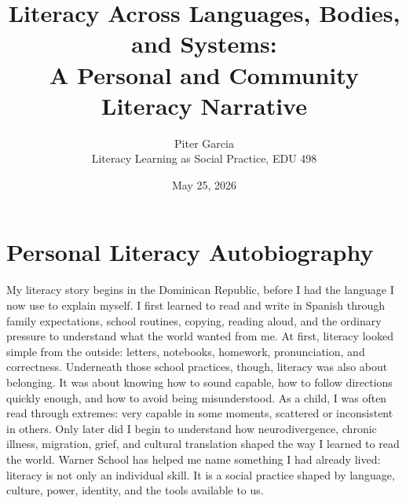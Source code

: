\documentclass[11pt]{article}
\title{Literacy Across Languages, Bodies, and Systems:\\A Personal and Community Literacy Narrative}
\author{Piter Garcia\\Literacy Learning as Social Practice, EDU 498}
\date{May 25, 2026}
\begin{document}
\maketitle
\thispagestyle{fancy}

\section*{Personal Literacy Autobiography}

My literacy story begins in the Dominican Republic, before I had the language I now use to explain myself. I first learned to read and write in Spanish through family expectations, school routines, copying, reading aloud, and the ordinary pressure to understand what the world wanted from me. At first, literacy looked simple from the outside: letters, notebooks, homework, pronunciation, and correctness. Underneath those school practices, though, literacy was also about belonging. It was about knowing how to sound capable, how to follow directions quickly enough, and how to avoid being misunderstood. As a child, I was often read through extremes: very capable in some moments, scattered or inconsistent in others. Only later did I begin to understand how neurodivergence, chronic illness, migration, grief, and cultural translation shaped the way I learned to read the world. Warner School has helped me name something I had already lived: literacy is not only an individual skill. It is a social practice shaped by language, culture, power, identity, and the tools available to us.
\end{document}
